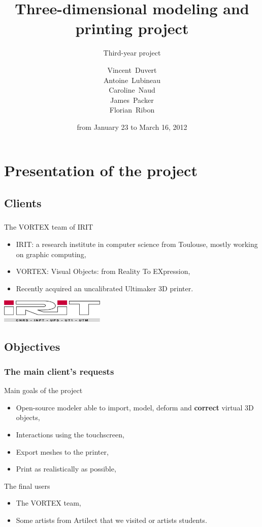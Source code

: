 \documentclass{beamer}
\title{Three-dimensional modeling and printing project}
\subtitle{Third-year project}
\author[V. Duvert, A. Lubineau, C. Naud, J. Packer, F. Ribon]{\scriptsize
Vincent~Duvert \\ Antoine~Lubineau \\ Caroline~Naud \\ James~Packer \\ Florian~Ribon}
\date{from January 23 to March 16, 2012}
\begin{document}
\frame{\titlepage}

\section{Presentation of the project}

\subsection{Clients}
\begin{frame}
	\frametitle{}
	
	\begin{block}{The VORTEX team of IRIT}
		\begin{itemize}
		\item IRIT: a research institute in computer science from Toulouse, mostly working on graphic computing,
		\item VORTEX: Visual Objects: from Reality To EXpression,
		\item Recently acquired an uncalibrated Ultimaker 3D printer.
		\end{itemize}
    \end{block}
    
    \begin{center}
		\includegraphics[width=5cm]{irit}
	\end{center}
    
\end{frame}

\subsection{Objectives}
\begin{frame}
	\frametitle{The main client's requests}
	\begin{block}{Main goals of the project} 
	\begin{itemize}
		\item Open-source modeler able to import, model, deform and \textbf{correct} virtual 3D objects,
		\item Interactions using the touchscreen,
		\item Export meshes to the printer,
		\item Print as realistically as possible,
	\end{itemize}
    \end{block}
    
    \begin{block}{The final users}
    	\begin{itemize}
		\item The VORTEX team,
		\item Some artists from Artilect that we visited or artists students.
		\end{itemize}
    \end{block}

\end{frame}
\end{document}
